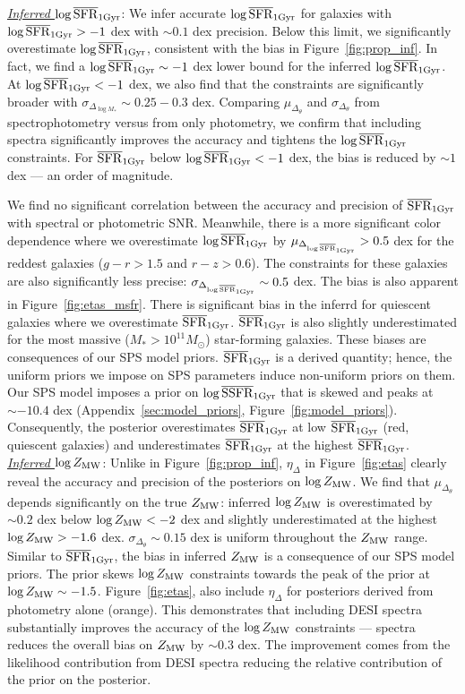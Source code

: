 \noindent \underline{\emph{Inferred $\log\overline{\rm SFR}_{\rm 1Gyr}$}}: 
We infer accurate $\log\overline{\rm SFR}_{\rm 1Gyr}$ for galaxies with $\log\overline{\rm SFR}_{\rm 1Gyr} > -1$ dex with
${\sim} 0.1$ dex precision. 
Below this limit, we significantly overestimate $\log \overline{\rm SFR}_{\rm 1Gyr}$, consistent with
the bias in Figure~\ref{fig:prop_inf}. 
In fact, we find a $\log \overline{\rm SFR}_{\rm 1Gyr} \sim -1$ dex lower bound for the inferred
$\log \overline{\rm SFR}_{\rm 1Gyr}$. 
At $\log\overline{\rm SFR}_{\rm 1Gyr} < -1$ dex, we also find that the constraints are significantly
broader with $\sigma_{\Delta_{\log M_*}} \sim 0.25 - 0.3$ dex.
Comparing $\mu_{\Delta_{\theta}}$ and $\sigma_{\Delta_{\theta}}$ from
spectrophotometry versus from only photometry, we confirm that including
spectra significantly improves the accuracy and tightens the $\log\overline{\rm SFR}_{\rm 1Gyr}$
constraints.
For $\overline{\rm SFR}_{\rm 1Gyr}$ below $\log\overline{\rm SFR}_{\rm 1Gyr} < -1$ dex, the bias is reduced by ${\sim}1$
dex --- an order of magnitude. 

We find no significant correlation between the accuracy and precision of
$\overline{\rm SFR}_{\rm 1Gyr}$ with spectral or photometric SNR.
Meanwhile, there is a more significant color dependence where we overestimate
$\log\overline{\rm SFR}_{\rm 1Gyr}$ by $\mu_{\Delta_{\log\overline{\rm SFR}_{\rm 1Gyr}}}>0.5$ dex for the reddest galaxies
($g-r > 1.5$ and $r-z> 0.6$).
The constraints for these galaxies are also significantly less precise:
$\sigma_{\Delta_{\log\overline{\rm SFR}_{\rm 1Gyr}}} \sim 0.5$ dex. 
The bias is also apparent in Figure~\ref{fig:etas_msfr}. 
There is significant bias in the inferrd for quiescent galaxies where we
overestimate $\overline{\rm SFR}_{\rm 1Gyr}$. 
$\overline{\rm SFR}_{\rm 1Gyr}$ is also slightly underestimated for the most massive ($M_* >
10^{11}M_\odot$) star-forming galaxies. 
These biases are consequences of our SPS model priors.
$\overline{\rm SFR}_{\rm 1Gyr}$ is a derived quantity; hence, the uniform priors we impose on SPS
parameters induce non-uniform priors on them.
Our SPS model imposes a prior on $\log \overline{\rm SSFR}_{\rm 1 Gyr}$
that is skewed and peaks at ${\sim}-10.4$ dex (Appendix~\ref{sec:model_priors}, Figure~\ref{fig:model_priors}). 
Consequently, the posterior overestimates $\overline{\rm SFR}_{\rm 1Gyr}$ at low $\overline{\rm SFR}_{\rm 1Gyr}$ (red,
quiescent galaxies) and underestimates $\overline{\rm SFR}_{\rm 1Gyr}$ at the highest $\overline{\rm SFR}_{\rm 1Gyr}$. \\

\noindent \underline{\emph{Inferred $\log Z_{\rm MW}$}}:  
Unlike in Figure~\ref{fig:prop_inf}, $\eta_\Delta$ in Figure~\ref{fig:etas}
clearly reveal the accuracy and precision of the posteriors on $\log Z_{\rm MW}$. 
We find that $\mu_{\Delta_{\theta}}$ depends significantly on the true $Z_{\rm MW}$: 
inferred $\log Z_{\rm MW}$ is overestimated by ${\sim}0.2$ dex below $\log Z_{\rm MW} <
-2$ dex and slightly underestimated at the highest $\log Z_{\rm MW} > -1.6$ dex.
$\sigma_{\Delta_\theta} \sim 0.15$ dex is uniform throughout the $Z_{\rm MW}$ range.
Similar to $\overline{\rm SFR}_{\rm 1Gyr}$, the bias in inferred $Z_{\rm MW}$ is a consequence of our SPS
model priors. 
The prior skews $\log Z_{\rm MW}$ constraints towards the peak of the prior at
$\log Z_{\rm MW}\sim-1.5$. 
Figure~\ref{fig:etas}, also include $\eta_\Delta$ for posteriors derived from
photometry alone (orange). 
This demonstrates that including DESI spectra substantially improves the
accuracy of the $\log Z_{\rm MW}$ constraints --- spectra reduces the overall bias on
$Z_{\rm MW}$ by $\sim0.3$ dex. 
The improvement comes from the likelihood contribution from DESI spectra
reducing the relative contribution of the prior on the posterior. 

